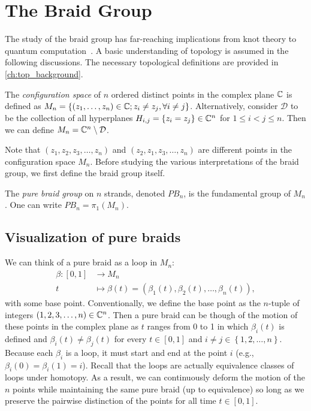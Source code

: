 \chapter{The Braid Group}\label{ch:braid_group}

The study of the braid group has far-reaching implications from knot theory to quantum computation~\cite{Artin1947,Date2003,Delaney2016,Deshmukh,Kassel2008,Khare2005}. A basic understanding of topology is assumed in the following discussions. The necessary topological definitions are provided in \cref{ch:top_background}.

\begin{definition}
    The \textit{configuration space} of $n$ ordered distinct points in the complex plane $\mathbb{C}$ is defined as $M_n = \left\{ \left( z_1,\dots,z_n \right)\in\mathbb{C} ; z_i\neq z_j,\forall i\neq j \right\}$. Alternatively, consider $\mathcal{D}$ to be the collection of all hyperplanes $H_{i,j}=\left\{ z_i=z_j \right\}\in\mathbb{C}^n$ for $1\leq i < j \leq n$. Then we can define $M_n = \mathbb{C}^n \setminus \mathcal{D}$.
\end{definition}

Note that $\left( z_1,z_2,z_3,\dots,z_n \right)$ and $\left( z_2,z_1,z_3,\dots,z_n \right)$ are different points in the configuration space $M_n$. Before studying the various interpretations of the braid group, we first define the braid group itself.

\begin{definition}
    The \textit{pure braid group} on $n$ strands, denoted $PB_n$, is the fundamental group of $M_n$. One can write $PB_n = \pi_1(M_n)$.
\end{definition}

\section{Visualization of pure braids}

We can think of a pure braid as a loop in $M_n$:
\begin{align*}
    \beta : \left[ 0,1 \right] &\to M_n \\
    t &\mapsto \beta(t) = \left( \beta_1(t),\beta_2(t),\dots,\beta_n(t) \right),
\end{align*}
with some base point. Conventionally, we define the base point as the $n$-tuple of integers $(1,2,3,\dots,n)\in \mathbb{C}^n$. Then a pure braid can be though of the motion of these points in the complex plane as $t$ ranges from 0 to 1 in which $\beta_i(t)$ is defined and $\beta_i(t)\neq \beta_j(t)$ for every $t\in[0,1]$ and $i\neq j\in\left\{ 1,2,\dots,n \right\}$. Because each $\beta_i$ is a loop, it must start and end at the point $i$ (e.g., $\beta_i(0)=\beta_i(1)=i$). Recall that the loops are actually equivalence classes of loops under homotopy. As a result, we can continuously deform the motion of the $n$ points while maintaining the same pure braid (up to equivalence) so long as we preserve the pairwise distinction of the points for all time $t\in[0,1]$.

